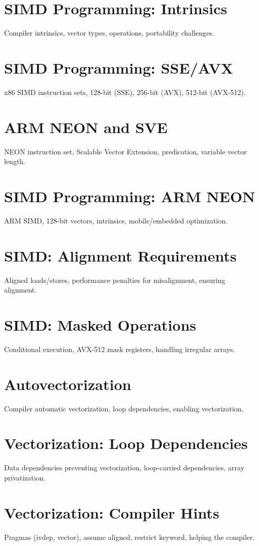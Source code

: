 \chapter{SIMD Programming: Intrinsics}
Compiler intrinsics, vector types, operations, portability challenges.

\chapter{SIMD Programming: SSE/AVX}
x86 SIMD instruction sets, 128-bit (SSE), 256-bit (AVX), 512-bit (AVX-512).

\chapter{ARM NEON and SVE}
NEON instruction set, Scalable Vector Extension, predication, variable vector length.

\chapter{SIMD Programming: ARM NEON}
ARM SIMD, 128-bit vectors, intrinsics, mobile/embedded optimization.

\chapter{SIMD: Alignment Requirements}
Aligned loads/stores, performance penalties for misalignment, ensuring alignment.

\chapter{SIMD: Masked Operations}
Conditional execution, AVX-512 mask registers, handling irregular arrays.

\chapter{Autovectorization}
Compiler automatic vectorization, loop dependencies, enabling vectorization.

\chapter{Vectorization: Loop Dependencies}
Data dependencies preventing vectorization, loop-carried dependencies, array privatization.

\chapter{Vectorization: Compiler Hints}
Pragmas (ivdep, vector), assume aligned, restrict keyword, helping the compiler.

